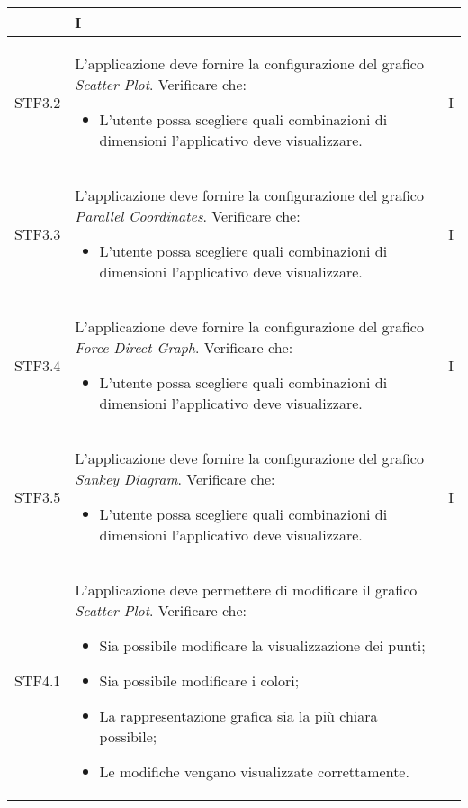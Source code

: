\begin{center}
\begin{longtable}{|p{1.5cm}|p{11cm}|p{1cm}|}
\begin{itemize}
        \end{itemize} & I\\ \hline
        \rowcolor[HTML]{C0C0C0}
        STF3.2 & L'applicazione deve fornire la configurazione del grafico \textit{Scatter Plot}. Verificare che: \begin{itemize}
            \item L'utente possa scegliere quali combinazioni di dimensioni l'applicativo deve visualizzare.
        \end{itemize} & I\\ \hline
        \rowcolor[HTML]{EFEFEF}
        STF3.3 & L'applicazione deve fornire la configurazione del grafico \textit{Parallel Coordinates}. Verificare che: \begin{itemize}
            \item L'utente possa scegliere quali combinazioni di dimensioni l'applicativo deve visualizzare.
        \end{itemize} & I\\ \hline
        \rowcolor[HTML]{C0C0C0}
        STF3.4 & L'applicazione deve fornire la configurazione del grafico \textit{Force-Direct Graph}. Verificare che: \begin{itemize}
            \item L'utente possa scegliere quali combinazioni di dimensioni l'applicativo deve visualizzare.
        \end{itemize} & I\\ \hline
        \rowcolor[HTML]{EFEFEF}
        STF3.5 & L'applicazione deve fornire la configurazione del grafico \textit{Sankey Diagram}. Verificare che: \begin{itemize}
            \item L'utente possa scegliere quali combinazioni di dimensioni l'applicativo deve visualizzare.
        \end{itemize} & I\\ \hline
        \rowcolor[HTML]{C0C0C0}
        STF4.1 & L'applicazione deve permettere di modificare il grafico \textit{Scatter Plot}. Verificare che: \begin{itemize}
            \item Sia possibile modificare la visualizzazione dei punti;
            \item Sia possibile modificare i colori;
            \item La rappresentazione grafica sia la più chiara possibile;
            \item Le modifiche vengano visualizzate correttamente.

\end{itemize}
\end{longtable}
\end{center}
